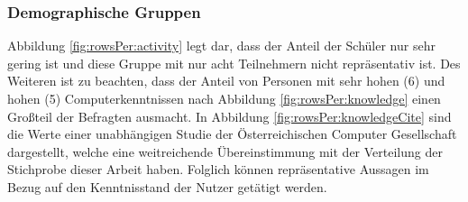\documentclass[a4paper]{article}
\begin{document}
            \subsubsection{Demographische Gruppen}\label{section:demographic_groups}
                Abbildung \ref{fig:rowsPer:activity} legt dar, dass der Anteil der Schüler nur sehr gering ist und diese Gruppe mit nur acht Teilnehmern nicht repräsentativ ist. Des Weiteren ist zu beachten, dass der Anteil von Personen mit sehr hohen (6) und hohen (5) Computerkenntnissen nach Abbildung \ref{fig:rowsPer:knowledge} einen Großteil der Befragten ausmacht. In Abbildung \ref{fig:rowsPer:knowledgeCite} sind die Werte einer unabhängigen Studie der Österreichischen Computer Gesellschaft\cite{demographicDistributionKnowledge} dargestellt, welche eine weitreichende Übereinstimmung mit der Verteilung der Stichprobe dieser Arbeit haben. Folglich können repräsentative Aussagen im Bezug auf den Kenntnisstand der Nutzer getätigt werden.
            
\end{document}
